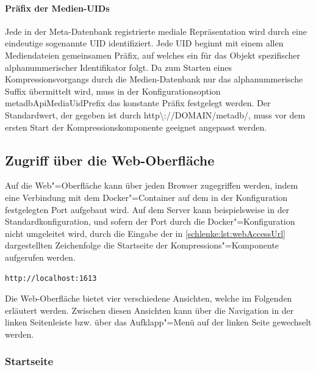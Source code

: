 \paragraph{Präfix der Medien-UIDs} Jede in der Meta-Datenbank registrierte mediale Repräsentation wird durch eine eindeutige sogenannte UID identifiziert. Jede UID beginnt mit einem allen Mediendateien gemeinsamen Präfix, auf welches ein für das Objekt spezifischer alphanummerischer Identifikator folgt. Da zum Starten eines Kompressionsvorgangs durch die Medien-Datenbank nur das alphanummerische Suffix übermittelt wird, muss in der Konfigurationsoption {\ttfamily metadb\-Api\-Media\-Uid\-Prefix} das konstante Präfix festgelegt werden. Der Standardwert, der gegeben ist durch {\ttfamily http\textbackslash ://DOMAIN/metadb/}, muss vor dem ersten Start der Kompressionskomponente geeignet angepasst werden.

\subsection{Zugriff über die Web-Oberfläche}
\label{schlenke:chp:webui}

Auf die Web"=Oberfläche kann über jeden Browser zugegriffen werden, indem eine Verbindung mit dem Docker"=Container auf dem in der Konfiguration festgelegten Port aufgebaut wird. Auf dem Server kann beispielsweise in der Standardkonfiguration, und sofern der Port durch die Docker"=Konfiguration nicht umgeleitet wird, durch die Eingabe der in \autoref{schlenke:lst:webAccessUrl} dargestellten Zeichenfolge die Startseite der Kompressions"=Komponente aufgerufen werden.
\begin{lstlisting}[caption={Zugriff auf die Web-Oberfläche der Kompressions-Komponente},label=schlenke:lst:webAccessUrl]
	http://localhost:1613
\end{lstlisting}
Die Web-Oberfläche bietet vier verschiedene Ansichten, welche im Folgenden erläutert werden. Zwischen diesen Ansichten kann über die Navigation in der linken Seitenleiste bzw. über das Aufklapp"=Menü auf der linken Seite gewechselt werden.

\subsubsection{Startseite}

